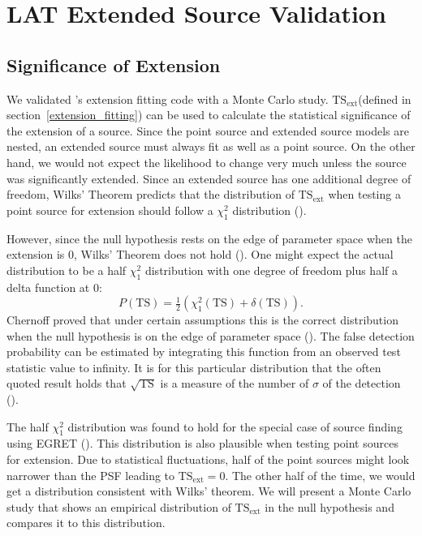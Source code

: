 \documentclass[12pt,preprint]{aastex}
\newcommand{\tsext}{{\ensuremath{\text{TS}_{\text{ext}}}}\xspace}
\newcommand{\ts}{\text{TS}\xspace}
\newcommand{\pointlike}{\text{\em pointlike}\xspace}
\begin{document}
\section{LAT Extended Source Validation}


\subsection{Significance of Extension}
\label{monte_carlo_validation}

We validated \pointlike's extension fitting code with a Monte Carlo
study. \tsext (defined in section~\ref{extension_fitting}) can be used to calculate the statistical significance
of the extension of a source.  Since the point source and extended source models are
nested, an extended source must always fit as well as a point source.  On the other hand, we would
not expect the likelihood to change very much unless the source was
significantly extended.  Since an extended source has one additional
degree of freedom, Wilks' Theorem predicts that the distribution of $\tsext$
when testing a point source for extension should follow a $\chi^2_1$
distribution (\cite{wilks_theorem}).

However, since the null hypothesis rests on the edge of
parameter space when the extension is 0, Wilks' Theorem does not hold
(\cite{warn_wilks_theorem}).  One might expect the actual distribution
to be a half $\chi^2_1$ distribution with one degree of freedom plus
half a delta function at 0:
\begin{equation}
  P(\ts)=\tfrac{1}{2}(\chi^2_1(\ts)+\delta(\ts)).
\end{equation}
Chernoff proved that under certain assumptions this is the correct distribution
when the null hypothesis is on the edge of parameter
space (\cite{chernoff}).  The false detection
probability can be estimated by integrating this function from an observed
test statistic value to infinity. It is for this particular distribution
that the often quoted result holds that $\sqrt{\ts}$ is a measure of
the number of $\sigma$ of the detection (\cite{mattox_egret}).

The half $\chi^2_1$ distribution was found to hold for the special case
of source finding using EGRET (\cite{mattox_egret}). This distribution
is also plausible when testing point sources for extension. Due to
statistical fluctuations, half of the point sources might look narrower
than the PSF leading to $\tsext=0$. The other half of the time, we would
get a distribution consistent with Wilks' theorem. We will present a
Monte Carlo study that shows an empirical distribution of \tsext in the
null hypothesis and compares it to this distribution.
\end{document}

